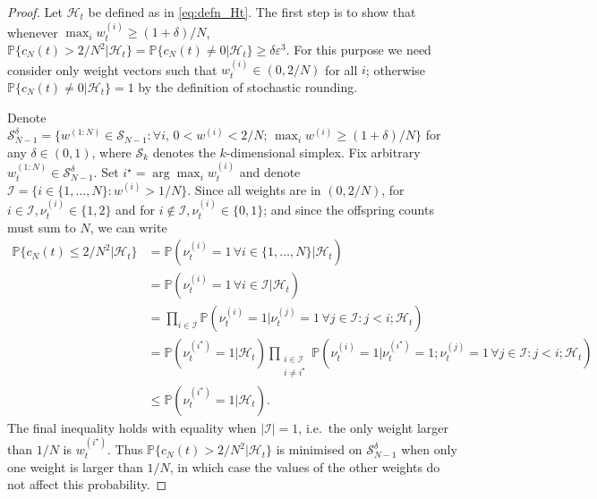 \documentclass{article}
\newcommand{\Prob}{\mathbb{P}}
\newcommand{\1}[1]{\mathbb{I}_{#1}}
\begin{document}
\begin{proof}
Let $\mathcal{H}_t$ be defined as in \eqref{eq:defn_Ht}. The first step is to show that whenever $\max_i w_t^{(i)} \geq (1+\delta)/N$, $\Prob\{ c_N(t) > 2/N^2 | \mathcal{H}_t \} = \Prob\{ c_N(t) \neq 0 | \mathcal{H}_t \} \geq \delta\varepsilon^3$.
For this purpose we need consider only weight vectors such that $w_t^{(i)} \in (0,2/N)$ for all $i$; otherwise $\Prob\{ c_N(t) \neq 0 | \mathcal{H}_t \} =1$ by the definition of stochastic rounding.

Denote $\mathcal{S}_{N-1}^\delta = \{ w^{(1:N)} \in \mathcal{S}_{N-1} :  \forall i, \, 0 <w^{(i)} <2/N ;\, \max_i w^{(i)} \geq (1 + \delta)/N \}$ for any $\delta \in (0, 1)$, where $\mathcal{S}_{k}$ denotes the $k$-dimensional simplex.
Fix arbitrary $w_t^{(1:N)} \in \mathcal{S}_{N-1}^\delta$. Set $i^\star = \arg\max_i w_t^{(i)}$ and denote $\mathcal{I} = \{i \in \{1,\dots,N\} : w^{(i)} > 1/N \}$.
Since all weights are in $(0, 2/N)$, for $i \in \mathcal{I}, \nu_t^{(i)} \in \{1,2\}$ and for $i \notin \mathcal{I}, \nu_t^{(i)} \in \{0,1\}$; and since the offspring counts must sum to $N$, we can write
\begin{align*}
\Prob\{ c_N(t) \leq 2/N^2 | \mathcal{H}_t \}
&= \Prob( \nu_t^{(i)} =1 \,\forall i\in\{1,\dots,N\} | \mathcal{H}_t )\\
&= \Prob( \nu_t^{(i)} =1 \,\forall i\in \mathcal{I} | \mathcal{H}_t ) \\
&= \prod_{i \in \mathcal{I}} \Prob( \nu_t^{(i)} =1 | \nu_t^{(j)}=1 \,\forall j \in \mathcal{I}: j<i; \mathcal{H}_t ) \\
&= \Prob( \nu_t^{(i^\star)} =1 | \mathcal{H}_t ) \prod_{\substack{i \in \mathcal{I} \\ i \neq i^\star}} \Prob( \nu_t^{(i)} =1 | \nu_t^{(i^\star)}=1; \nu_t^{(j)}=1 \,\forall j \in \mathcal{I}: j<i ; \mathcal{H}_t ) \\
&\leq \Prob( \nu_t^{(i^\star)} =1 | \mathcal{H}_t ) .
\end{align*}
The final inequality holds with equality when $|\mathcal{I}| =1$, i.e.\ the only weight larger than $1/N$ is $w_t^{(i^\star)}$.
Thus $\Prob\{ c_N(t) > 2/N^2 | \mathcal{H}_t \}$ is minimised on $\mathcal{S}_{N-1}^\delta$ when only one weight is larger than $1/N$, in which case the values of the other weights do not affect this probability. 


\end{proof}
\end{document}
